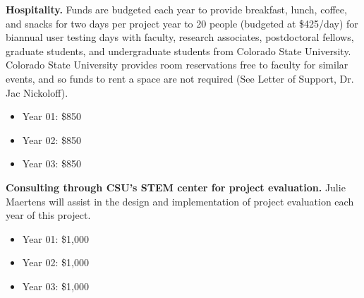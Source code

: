 \documentclass[pdftex,english,11pt,parskip=half]{scrartcl}
\begin{document}
\noindent \textbf{Hospitality.} Funds are budgeted each year to provide breakfast, lunch, coffee, and snacks for two days per project year to 20 people (budgeted at \$425/day) for biannual user testing days with faculty, research associates, postdoctoral fellows, graduate students, and undergraduate students from Colorado State University. Colorado State University provides room reservations free to faculty for similar events, and so funds to rent a space are not required (See Letter of Support, Dr. Jac Nickoloff).
\begin{itemize}
\item Year 01: \$850
\item Year 02: \$850
\item Year 03: \$850
\end{itemize}

\noindent \textbf{Consulting through CSU's STEM center for project evaluation.} Julie Maertens will assist in the design and implementation of project evaluation each year of this project.
\begin{itemize}
\item Year 01: \$1,000
\item Year 02: \$1,000
\item Year 03: \$1,000
\end{itemize}
\end{document}
